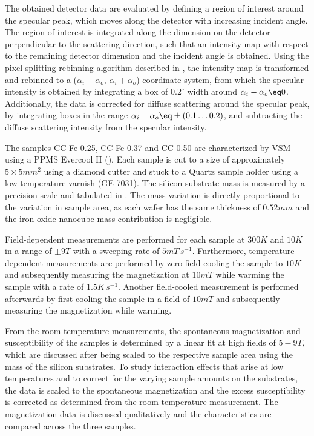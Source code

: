 \documentclass[\main/dresen_thesis.tex]{subfiles}
\begin{document}
    The obtained detector data are evaluated by defining a region of interest around the specular peak, which moves along the detector with increasing incident angle.
    The region of interest is integrated along the dimension on the detector perpendicular to the scattering direction, such that an intensity map with respect to the remaining detector dimension and the incident angle is obtained.
    Using the pixel-splitting rebinning algorithm described in , the intensity map is transformed and rebinned to a ($\alpha_i - \alpha_o$, $\alpha_i+\alpha_o$) coordinate system, from which the specular intensity is obtained by integrating a box of $0.2 ^\circ$ width around $\alpha_i - \alpha_o \eq 0$.
    Additionally, the data is corrected for diffuse scattering around the specular peak, by integrating boxes in the range $\alpha_i - \alpha_o \eq \pm (0.1 \ldots 0.2)$, and subtracting the diffuse scattering intensity from the specular intensity.


    The samples CC-Fe-0.25, CC-Fe-0.37 and CC-0.50 are characterized by VSM using a PPMS Evercool II ().
    Each sample is cut to a size of approximately $5 \times 5 \unit{mm^2}$ using a diamond cutter and stuck to a Quartz sample holder using a low temperature varnish (GE 7031).
    The silicon substrate mass is measured by a precision scale and tabulated in .
    The mass variation is directly proportional to the variation in sample area, as each wafer has the same thickness of $0.52 \unit{mm}$ and the iron oxide nanocube mass contribution is negligible.

    Field-dependent measurements are performed for each sample at $300 \unit{K}$ and $10 \unit{K}$ in a range of $\pm 9 \unit{T}$ with a sweeping rate of $5 \unit{mT \, s^{-1}}$.
    Furthermore, temperature-dependent measurements are performed by zero-field cooling the sample to $10 \unit{K}$ and subsequently measuring the magnetization at $10 \unit{mT}$ while warming the sample with a rate of $1.5 \unit{K \, s^{-1}}$.
    Another field-cooled measurement is performed afterwards by first cooling the sample in a field of $10 \unit{mT}$ and subsequently measuring the magnetization while warming.

    From the room temperature measurements, the spontaneous magnetization and susceptibility of the samples is determined by a linear fit at high fields of $5 - 9 \unit{T}$, which are discussed after being scaled to the respective sample area using the mass of the silicon substrates.
    To study interaction effects that arise at low temperatures and to correct for the varying sample amounts on the substrates, the data is scaled to the spontaneous magnetization and the excess susceptibility is corrected as determined from the room temperature measurement.
    The magnetization data is discussed qualitatively and the characteristics are compared across the three samples.
\end{document}
